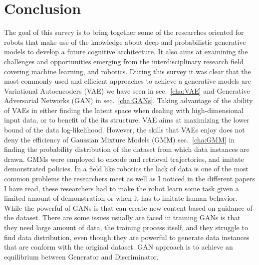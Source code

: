 
\pagestyle{fancy} 
\chapter*{Conclusion}
\vspace{-15pt}

The goal of this survey is to bring together some of the researches oriented for robots that make use of the knowledge about deep and probabilistic generative models to develop a future cognitive architecture. It also aims at examining the challenges and opportunities emerging from the interdisciplinary research field covering machine learning, and robotics. During this survey it was clear that the most commonly used and efficient approaches to achieve a generative models are Variational Autoencoders (VAE) we have seen in sec.~\ref{cha:VAE} and Generative Adversarial Networks (GAN) in sec.~\ref{cha:GANs}. Taking advantage of the ability of VAEs in either finding the latent space when dealing with high-dimensional input data, or to benefit of the its structure. VAE aims at maximizing the lower bound of the data log-likelihood. However, the skills that VAEs enjoy does not deny the efficiency of Gaussian Mixture Models (GMM) sec.~\ref{cha:GMM} in finding the probability distribution of the dataset from which data instances are drawn. GMMs were employed to encode and retrieval trajectories, and imitate demonstrated policies. In a field like robotics the lack of data is one of the most common problems the researchers meet as well as I noticed in the different papers I have read, these researchers had to make the robot learn some task given a limited amount of demonstration or when it has to imitate human behavior. While the powerful of GANs is that can create new content based on guidance of the dataset. There are some issues usually are faced in training GANs is that they need large amount of data,  the training process itself, and they struggle to find data distribution, even though they are powerful to generate data instances that are conform with the original dataset. GAN approach is to achieve an equilibrium between Generator and Discriminator.  
